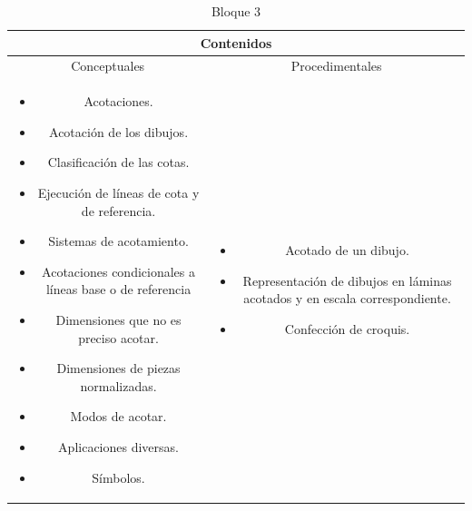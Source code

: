 \documentclass[../main]{subfiles}
\begin{document}
\begin{table}[h]
    \centering
    \begin{tabular}{|c|c|} \hline
         \multicolumn{2}{|c|}{Contenidos} \\ \hline
         Conceptuales & Procedimentales  \\ \hline \hline
        \begin{minipage} [t] {0.4\textwidth} 
            \begin{itemize}
                \item Acotaciones.
                \item Acotación de los dibujos. 
                \item Clasificación de las cotas.
                \item Ejecución de líneas de cota y de referencia.
                \item Sistemas de acotamiento.
                \item Acotaciones condicionales a líneas base o de referencia
                \item Dimensiones que no es preciso acotar.
                \item Dimensiones de piezas normalizadas.
                \item Modos de acotar.
                \item Aplicaciones diversas.
                \item Símbolos.
            \end{itemize}
        \end{minipage} &  \begin{minipage} [t] {0.4\textwidth} 
            \begin{itemize}
                \item Acotado de un dibujo.
                \item Representación de dibujos en láminas acotados y en escala correspondiente.
                \item Confección de croquis.
            \end{itemize}
        \end{minipage} \\ \hline
       \end{tabular}
    \caption{Bloque 3}
\end{table}
\end{document}
